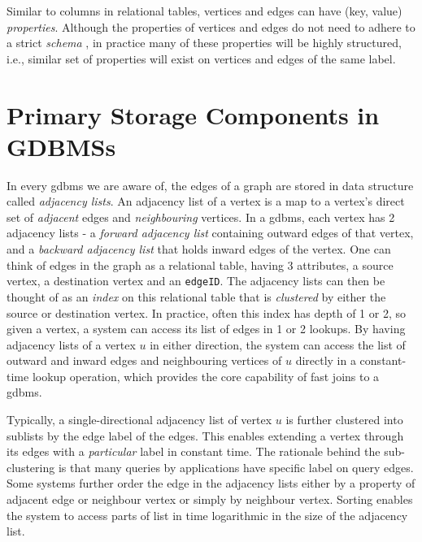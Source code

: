 Similar to columns in relational tables, vertices and edges can have (key, value) \emph{properties}. Although the properties of vertices and edges do not need to adhere to a strict \emph{schema }, in practice many of these properties will be highly structured, i.e., similar set of properties will exist on vertices and edges of the same label.

\section{Primary Storage Components in GDBMSs}
\label{sec:storage-components}

In every \gls{gdbms} we are aware of, the edges of a graph are stored in data structure called \emph{adjacency lists}. An adjacency list of a vertex is a map to a vertex's direct set of \emph{adjacent} edges and \emph{neighbouring} vertices. In a \gls{gdbms}, each vertex has 2 adjacency lists - a \emph{forward adjacency list} containing outward edges of that vertex, and a \emph{backward adjacency list} that holds inward edges of the vertex. One can think of edges in the graph as a relational table, having 3 attributes, a source vertex, a destination vertex and an \texttt{edgeID}. The adjacency lists can then be thought of as an \emph{index} on this relational table that is \emph{clustered} by either the source or destination vertex. In practice, often this index has depth of 1 or 2, so given a vertex, a system can access its list of edges in 1 or 2 lookups. By having adjacency lists of a vertex $u$ in either direction, the system can access the list of outward and inward edges and neighbouring vertices of $u$ directly in a constant-time lookup operation, which provides the core capability of fast joins to a \gls{gdbms}. 

Typically, a single-directional adjacency list of vertex $u$ is further clustered into sublists by the edge label of the edges. This enables extending a vertex through its edges with a \emph{particular} label in constant time. The rationale behind the sub-clustering is that many queries by applications have specific label on query edges. Some systems further order the edge in the adjacency lists either by a property of adjacent edge or neighbour vertex or simply by neighbour vertex. Sorting enables the system to access parts of list in time logarithmic in the size of the adjacency list.


